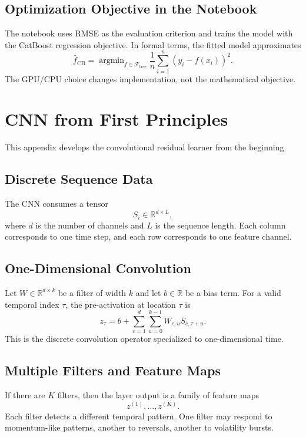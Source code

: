 \documentclass[11pt]{article}
\newcommand{\R}{\mathbb{R}}
\newcommand{\1}{\mathbf{1}}
\newcommand{\argmin}{\mathop{\mathrm{argmin}}}
\begin{document}
\subsection{Optimization Objective in the Notebook}

The notebook uses RMSE as the evaluation criterion and trains the model with the CatBoost regression objective. In formal terms, the fitted model approximates
\[
\hat f_{\mathrm{CB}} = \argmin_{f \in \mathcal{F}_{\mathrm{tree}}} \frac{1}{n} \sum_{i=1}^n (y_i - f(x_i))^2.
\]
The GPU/CPU choice changes implementation, not the mathematical objective.

\section{CNN from First Principles}

This appendix develops the convolutional residual learner from the beginning.

\subsection{Discrete Sequence Data}

The CNN consumes a tensor
\[
S_i \in \R^{d \times L},
\]
where $d$ is the number of channels and $L$ is the sequence length. Each column corresponds to one time step, and each row corresponds to one feature channel.

\subsection{One-Dimensional Convolution}

Let $W \in \R^{d \times k}$ be a filter of width $k$ and let $b \in \R$ be a bias term. For a valid temporal index $\tau$, the pre-activation at location $\tau$ is
\[
z_\tau = b + \sum_{c=1}^d \sum_{u=0}^{k-1} W_{c,u} S_{c,\tau+u}.
\]
This is the discrete convolution operator specialized to one-dimensional time.

\subsection{Multiple Filters and Feature Maps}

If there are $K$ filters, then the layer output is a family of feature maps
\[
z^{(1)},\dots,z^{(K)}.
\]
Each filter detects a different temporal pattern. One filter may respond to momentum-like patterns, another to reversals, another to volatility bursts.
\end{document}
